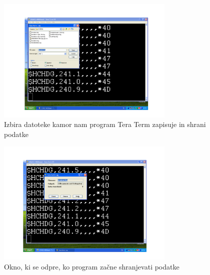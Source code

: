 \begin{figure}
	\centering
	\includegraphics[height=6cm]{Vaje/VzorecPoroc/figs/IzbiraDatoteke.pdf}
	\caption{Izbira datoteke kamor nam program Tera Term zapisuje in shrani podatke}
	\label{fig:TT_datotek}       %
\end{figure}

\begin{figure}
	\centering
	\includegraphics[height=6cm]{Vaje/VzorecPoroc/figs/ShranDatoteke.pdf}
	\caption{Okno, ki se odpre, ko program začne shranjevati podatke}
	\label{fig:TT_shran}       %
\end{figure}

